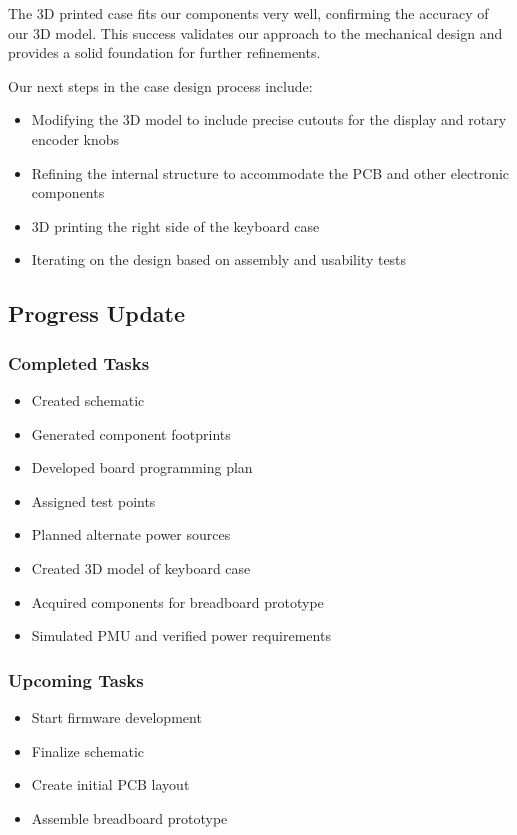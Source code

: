 \documentclass[a4paper,11pt]{article}%
\begin{document}
The 3D printed case fits our components very well, confirming the accuracy of our 3D model. This success validates our approach to the mechanical design and provides a solid foundation for further refinements.

Our next steps in the case design process include:

\begin{itemize}
    \item Modifying the 3D model to include precise cutouts for the display and rotary encoder knobs
    \item Refining the internal structure to accommodate the PCB and other electronic components
    \item 3D printing the right side of the keyboard case
    \item Iterating on the design based on assembly and usability tests
\end{itemize}


\subsection{Progress Update}

\subsubsection{Completed Tasks}
\begin{itemize}
    \item Created schematic
    \item Generated component footprints
    \item Developed board programming plan
    \item Assigned test points
    \item Planned alternate power sources
    \item Created 3D model of keyboard case
    \item Acquired components for breadboard prototype
    \item Simulated PMU and verified power requirements
\end{itemize}

\subsubsection{Upcoming Tasks}
\begin{itemize}
    \item Start firmware development
    \item Finalize schematic
    \item Create initial PCB layout
    \item Assemble breadboard prototype
\end{itemize}
\end{document}
